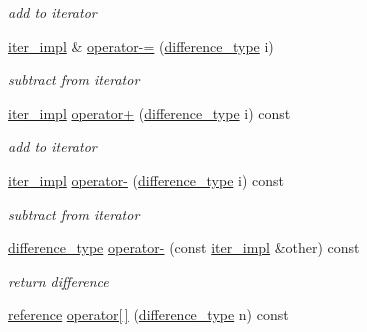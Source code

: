 \begin{DoxyCompactItemize}
\begin{DoxyCompactList}\small\item\em add to iterator \end{DoxyCompactList}\item 
\hyperlink{classnlohmann_1_1detail_1_1iter__impl}{iter\+\_\+impl} \& \hyperlink{classnlohmann_1_1detail_1_1iter__impl_abcc9d51bc52f2e8483bbe4018f05e978}{operator-\/=} (\hyperlink{classnlohmann_1_1detail_1_1iter__impl_a2f7ea9f7022850809c60fc3263775840}{difference\+\_\+type} i)
\begin{DoxyCompactList}\small\item\em subtract from iterator \end{DoxyCompactList}\item 
\hyperlink{classnlohmann_1_1detail_1_1iter__impl}{iter\+\_\+impl} \hyperlink{classnlohmann_1_1detail_1_1iter__impl_a8ef76aeb5a5032768f0f61f48ac189c0}{operator+} (\hyperlink{classnlohmann_1_1detail_1_1iter__impl_a2f7ea9f7022850809c60fc3263775840}{difference\+\_\+type} i) const
\begin{DoxyCompactList}\small\item\em add to iterator \end{DoxyCompactList}\item 
\hyperlink{classnlohmann_1_1detail_1_1iter__impl}{iter\+\_\+impl} \hyperlink{classnlohmann_1_1detail_1_1iter__impl_a0dd9c415b94a02ff2aa25da75e52da30}{operator-\/} (\hyperlink{classnlohmann_1_1detail_1_1iter__impl_a2f7ea9f7022850809c60fc3263775840}{difference\+\_\+type} i) const
\begin{DoxyCompactList}\small\item\em subtract from iterator \end{DoxyCompactList}\item 
\hyperlink{classnlohmann_1_1detail_1_1iter__impl_a2f7ea9f7022850809c60fc3263775840}{difference\+\_\+type} \hyperlink{classnlohmann_1_1detail_1_1iter__impl_a49bf3e708a9c1c88c415011735962d06}{operator-\/} (const \hyperlink{classnlohmann_1_1detail_1_1iter__impl}{iter\+\_\+impl} \&other) const
\begin{DoxyCompactList}\small\item\em return difference \end{DoxyCompactList}\item 
\hyperlink{classnlohmann_1_1detail_1_1iter__impl_a5be8001be099c6b82310f4d387b953ce}{reference} \hyperlink{classnlohmann_1_1detail_1_1iter__impl_ac0b9276f1102ed4b9cd3f5f56287e3ce}{operator\mbox{[}$\,$\mbox{]}} (\hyperlink{classnlohmann_1_1detail_1_1iter__impl_a2f7ea9f7022850809c60fc3263775840}{difference\+\_\+type} n) const

\end{DoxyCompactItemize}
